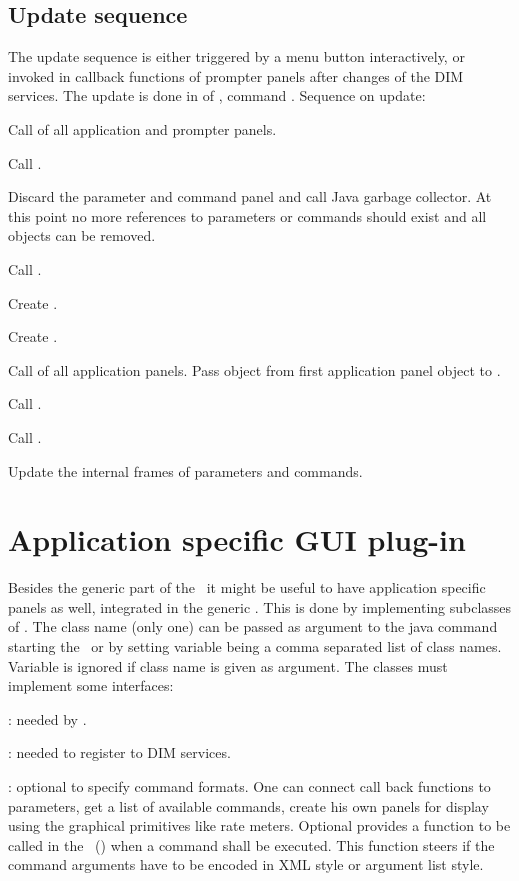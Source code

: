 \subsection{Update sequence}
The update sequence is either triggered by a menu button interactively, or invoked
in callback functions of prompter panels
after changes of the DIM services.
The update is done in  of , command .
Sequence on update:
\bnum
\item Call  of all application and prompter panels.
\item Call .
\item Discard the parameter and command panel and call Java garbage collector.
At this point no more references to parameters or commands should exist and
all objects can be removed.
\item Call .
\item Create .
\item Create .
\item Call  of all application panels. Pass
 object from first application panel object to .
\item Call . 
\item Call .
\item Update the internal frames of parameters and commands.
\enum 

\section{Application specific GUI plug-in}
Besides the generic part of the \gui\ it might be useful to have application specific panels as well, integrated in the generic \gui. This is done by implementing subclasses of  . The class name (only one) can be passed as argument to the java command starting the \gui\ or by setting variable  being a comma separated list of class names.
Variable is ignored if class name is given as argument.
The classes must implement some interfaces:
\bdes
\item [\class{xiUserPanel}]: needed by \gui.
\item [\class{xiUserInfoHandler}]: needed to register to DIM services.
\item [\class{xiUserCommand}]: optional to specify command formats.
\edes
One can connect call back functions to parameters, 
get a list of available commands,
create his own panels for display using the graphical primitives like rate meters.
Optional  provides a function to be called in the \gui\ 
() when a command shall be executed. This function steers if the command arguments have to be
encoded in XML style or argument list style.

